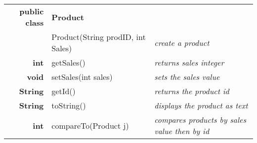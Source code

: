 \documentclass[11pt,fleqn]{article}
\begin{document}
\begin{table}[]
\begin{tabular}{rll}
\rowcolor[HTML]{710000} 
{\color[HTML]{FFFFFF} \textbf{public class}} & {\color[HTML]{FFFFFF} \textbf{Product}} & {\color[HTML]{FFFFFF} \textbf{}} \\
\textbf{}                        &   {\color[HTML]{000000} Product(String prodID, int Sales)} & {\color[HTML]{92302D} \textit{create a product}} \\
\textbf{int}                        &   {\color[HTML]{000000} getSales()} & {\color[HTML]{92302D} \textit{returns sales integer}} \\
\textbf{void}                        &   {\color[HTML]{000000} setSales(int sales)} & {\color[HTML]{92302D} \textit{sets the sales value}} \\
\textbf{String}                        &   {\color[HTML]{000000} getId()} & {\color[HTML]{92302D} \textit{returns the product id}} \\
\textbf{String}                        &   {\color[HTML]{000000} toString()} & {\color[HTML]{92302D} \textit{displays the product as text}} \\
\textbf{int}                        &   {\color[HTML]{000000} compareTo(Product j)} & {\color[HTML]{92302D} \textit{compares products by sales value then by id}} \\ \hline
\end{tabular}
\end{table}
\end{document}
